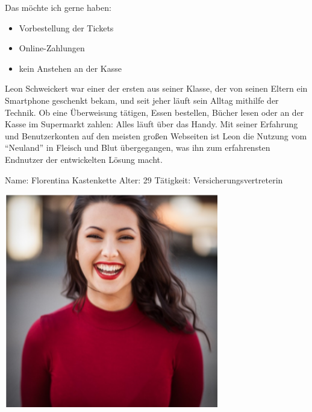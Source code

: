 Das möchte ich gerne haben:
\begin{itemize}
	\item Vorbestellung der Tickets
	\item Online-Zahlungen
	\item kein Anstehen an der Kasse
\end{itemize}

Leon Schweickert war einer der ersten aus seiner Klasse, der von seinen Eltern ein Smartphone geschenkt bekam, und seit jeher läuft sein Alltag mithilfe der Technik.
Ob eine Überweisung tätigen, Essen bestellen, Bücher lesen oder an der Kasse im Supermarkt zahlen: Alles läuft über das Handy.
Mit seiner Erfahrung und Benutzerkonten auf den meisten großen Webseiten ist Leon die Nutzung vom \enquote{Neuland} in Fleisch und Blut übergegangen, was ihn zum erfahrensten Endnutzer der entwickelten Lösung macht.

\newpage
{}
\begin{minipage}[t]{0.5\textwidth} 	\vspace{0.2\baselineskip} %
	\begin{entrylist}
		\entry
		{Name:}
		{Florentina Kastenkette}
		\entry
		{Alter:}
		{29}
		\entry
		{Tätigkeit:}
		{Versicherungsvertreterin}
	\end{entrylist}
	\begin{barchart}{5.0}\hspace{-1.5mm}
	\end{barchart}
\end{minipage}
\hfil
\begin{minipage}[t]{0.4\textwidth} 	\vspace{0.0\baselineskip} %
	\flushright
	\includegraphics[width=0.70\textwidth]{img/personas/florentina}
\end{minipage}

